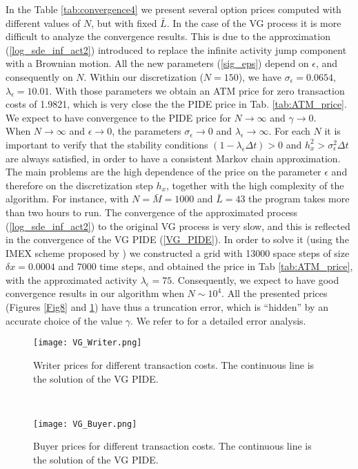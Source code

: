 In the Table \ref{tab:convergence4} we present several option prices computed with different values of $N$, but with fixed $\bar L$.
In the case of the VG process it is more difficult to analyze the convergence results.
This is due to the approximation (\ref{log_sde_inf_act2}) introduced to replace the infinite activity jump component with a Brownian motion. All the new parameters
(\ref{sig_eps}) depend on $\epsilon$, and consequently on $N$.
Within our discretization ($N=150$), we have $\sigma_{\epsilon} = 0.0654$, $\lambda_{\epsilon} = 10.01$. 
With those parameters we obtain an ATM price for zero transaction costs of 1.9821, which is very close the the PIDE price in Tab. \ref{tab:ATM_price}. 
We expect to have convergence to the PIDE price for $N\to \infty$ and $\gamma\to0$.\\
When $N \to \infty$ and $\epsilon \to 0$, the parameters $\sigma_{\epsilon} \to 0$ and $\lambda_{\epsilon}\to \infty$.
For each $N$ it is important to verify that the stability conditions $(1-\lambda_{\epsilon} \Delta t)>0$ and $h_x^2 > \sigma_{\epsilon}^2 \Delta t$ are always satisfied, 
in order to have a consistent Markov chain approximation.
The main problems are the high dependence of the price on the parameter $\epsilon$ and therefore on the discretization step $h_x$, together with the high complexity of the algorithm.
For instance, with $N=\bar M=1000$ and $\bar L = 43$ the program takes more than two hours to run. 
The convergence of the approximated process (\ref{log_sde_inf_act2}) to the original VG process is very slow, and this is reflected in the convergence 
of the VG PIDE (\ref{VG_PIDE}).
In order to solve it (using the IMEX scheme proposed by \cite{CoVo05b}) we constructed
a grid with 13000 space steps of size $\delta x = 0.0004$ and 7000 time steps, and obtained the price in Tab \ref{tab:ATM_price}, 
with the approximated activity $\lambda_{\epsilon} = 75$.
Consequently, we expect to have good convergence results in our algorithm when $N\sim 10^4$.
All the presented prices (Figures \ref{Fig8} and \ref{Fig9}) have thus a truncation error, which is ``hidden'' by an accurate choice of the value $\gamma$. 
We refer to \cite{CoVo05b} for a detailed error analysis.
\begin{figure}[t!]
 \begin{minipage}[b]{0.5\linewidth}
   \centering
   \texttt{[image: VG\_Writer.png]}
   \caption{Writer prices for different transaction costs. The continuous line is the solution of the VG PIDE.}
   \label{Fig8} 
 \end{minipage}
 \ \hspace{2mm} \hspace{3mm} \
 \begin{minipage}[b]{0.5\linewidth}
   \texttt{[image: VG\_Buyer.png]}
   \caption{Buyer prices for different transaction costs. The continuous line is the solution of the VG PIDE.}
   \label{Fig9}
 \end{minipage}
\end{figure}  

